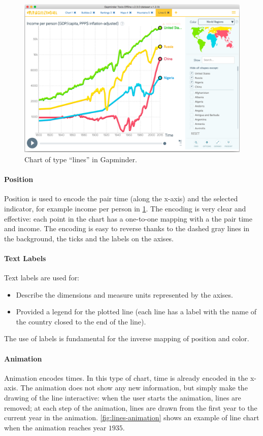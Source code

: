 \begin{figure}[h]
	\centering
	\includegraphics[width=0.95\columnwidth]{figures/lines}
	\caption{Chart of type ``lines'' in Gapminder.}
	\label{fig:lines}
\end{figure}

\paragraph{Position}
Position is used to encode the pair time (along the x-axis) and the selected indicator, for example income per person in \cref{fig:lines}.
The encoding is very clear and effective:
each point in the chart has a one-to-one mapping with a the pair time and income.
The encoding is easy to reverse thanks to the dashed gray lines in the background, the ticks and the labels on the axises.

\paragraph{Text Labels}
Text labels are used for:
\begin{itemize}
	\item Describe the dimensions and measure units represented by the axises.
	\item Provided a legend for the plotted line (each line has a label with the name of the country closed to the end of the line).
\end{itemize}
The use of labels is fundamental for the inverse mapping of position and color.

\paragraph{Animation}
Animation encodes times.
In this type of chart, time is already encoded in the x-axis.
The animation does not show any new information, but simply make the drawing of the line interactive:
when the user starts the animation, lines are removed;
at each step of the animation, lines are drawn from the first year to the current year in the animation.
\cref{fig:lines-animation} shows an example of line chart when the animation reaches year $1935$.

